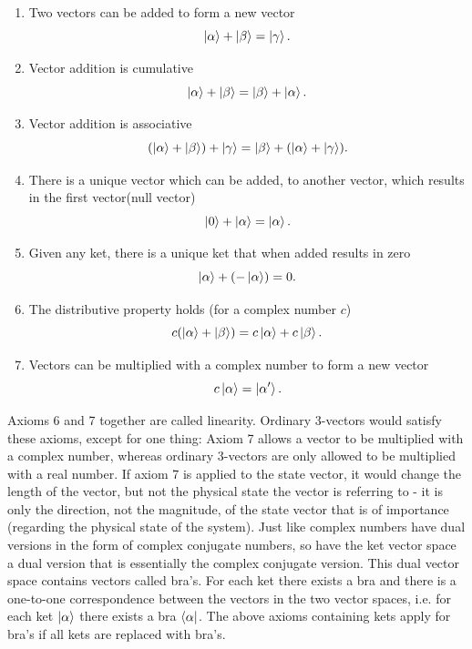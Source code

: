 \begin{enumerate} 
	\item Two vectors can be added to form a new vector
	\begin{equation}
		\ket{\alpha}+\ket{\beta}=\ket{\gamma}.
	\end{equation}  
	\item Vector addition is cumulative
	\begin{equation}
		\ket{\alpha}+\ket{\beta}=\ket{\beta}+\ket{\alpha}.
	\end{equation} 
	\item Vector addition is associative
	\begin{equation}
		(\ket{\alpha}+\ket{\beta})+\ket{\gamma}=\ket{\beta}+(\ket{\alpha}+\ket{\gamma}).
	\end{equation} 
	\item There is a unique vector which can be added, to another vector, which results in the first vector(null vector)
	\begin{equation}
		\ket{0}+\ket{\alpha}=\ket{\alpha}.
	\end{equation} 
	\item Given any ket, there is a unique ket that when added results in zero
	\begin{equation}
		\ket{\alpha}+(-\ket{\alpha})=0.
	\end{equation} 
	\item The distributive property holds (for a complex number $c$)
	\begin{equation}
		c(\ket{\alpha}+\ket{\beta})=c\ket{\alpha}+c\ket{\beta}.
	\end{equation} 
	\item Vectors can be multiplied with a complex number to form a new vector
	\begin{equation}
		c\ket{\alpha}=\ket{\alpha'}.
	\end{equation} 
\end{enumerate}
Axioms 6 and 7 together are called linearity. Ordinary 3-vectors would satisfy these axioms, except for one thing: Axiom 7 allows a vector to be multiplied with a complex number, whereas ordinary 3-vectors are only allowed to be multiplied with a real number. If axiom 7 is applied to the state vector, it would change the length of the vector, but not the physical state the vector is referring to - it is only the direction, not the magnitude, of the state vector that is of importance (regarding the physical state of the system).\newline
Just like complex numbers have dual versions in the form of complex conjugate numbers, so have the ket vector space a dual version that is essentially the complex conjugate version. This dual vector space contains vectors called bra's. For each ket there exists a bra and there is a one-to-one correspondence between the vectors in the two vector spaces, i.e. for each ket $\ket{\alpha}$ there exists a bra $\bra{\alpha}$. The above axioms containing kets apply for bra's if all kets are replaced with bra's.\newline

